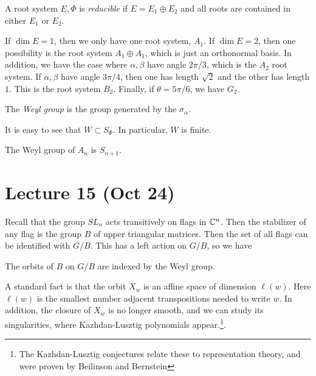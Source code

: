 \documentclass[twoside, 10pt]{article}
\begin{document}
    \begin{defn}
        A root system $E,\Phi$ is \textit{reducible} if $E = E_1 \oplus E_2$ and all roots are contained in either $E_1$ or $E_2$.
    \end{defn}

    \begin{exm}
        If $\dim E = 1$, then we only have one root system, $A_1$. If $\dim E = 2$, then one possibility is the root system $A_1 \oplus A_1$, which is just an orthonormal basis. In addition, we have the case where $\alpha,\beta$ have angle $2\pi/3$, which is the $A_2$ root system. If $\alpha,\beta$ have angle $3\pi/4$, then one has length $\sqrt{2}$ and the other has length $1$. This is the root system $B_2$. Finally, if $\theta = 5\pi/6$, we have $G_2$.
      
    \end{exm}

    \begin{defn}
        The \textit{Weyl group} is the group generated by the $\sigma_{\alpha}$.
    \end{defn}

    It is easy to see that $W \subset S_{\Phi}$. In particular, $W$ is finite.

    \begin{exm}
        The Weyl group of $A_n$ is $S_{n+1}$.
    \end{exm}
    
    \section{Lecture 15 (Oct 24)}%
    \label{sec:lecture_15_oct_24_}
    
    Recall that the group $SL_n$ acts transitively on flags in $\mathbb{C}^n$. Then the stabilizer of any flag is the group $B$ of upper triangular matrices. Then the set of all flags can be identified with $G/B$. This has a left action on $G/B$, so we have

    \begin{thm}[Bruhat]
        The orbits of $B$ on $G/B$ are indexed by the Weyl group.
    \end{thm}

    A standard fact is that the orbit $X_w$ is an affine space of dimension $\ell(w)$. Here $\ell(w)$ is the smallest number adjacent transpositions needed to write $w$. In addition, the closure of $X_w$ is no longer smooth, and we can study its singularities, where Kazhdan-Lusztig polynomials appear.\footnote{The Kazhdan-Lusztig conjectures relate these to representation theory, and were proven by Beilinson and Bernstein}.
\end{document}
